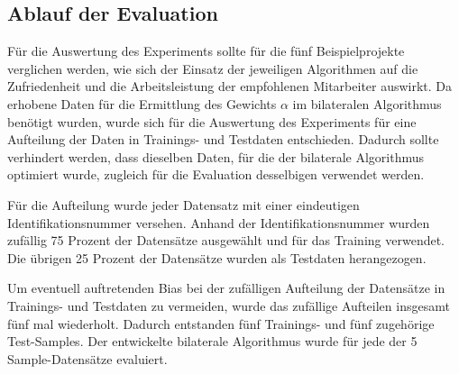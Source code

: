 




\subsection{Ablauf der Evaluation}
\label{ch:methodik:auswertung:ablauf}
Für die Auswertung des Experiments sollte für die fünf Beispielprojekte verglichen werden, wie sich der Einsatz der jeweiligen Algorithmen auf die Zufriedenheit und die Arbeitsleistung der empfohlenen Mitarbeiter auswirkt.
Da erhobene Daten für die Ermittlung des Gewichts $\alpha$ im bilateralen Algorithmus benötigt wurden, wurde sich für die Auswertung des Experiments für eine Aufteilung der Daten in Trainings- und Testdaten entschieden.
Dadurch sollte verhindert werden, dass dieselben Daten, für die der bilaterale Algorithmus optimiert wurde, zugleich für die Evaluation desselbigen verwendet werden.

Für die Aufteilung wurde jeder Datensatz mit einer eindeutigen Identifikationsnummer versehen.
Anhand der Identifikationsnummer wurden zufällig 75 Prozent der Datensätze ausgewählt und für das Training verwendet.
Die übrigen 25 Prozent der Datensätze wurden als Testdaten herangezogen.

Um eventuell auftretenden Bias bei der zufälligen Aufteilung der Datensätze in Trainings- und Testdaten zu vermeiden, wurde das zufällige Aufteilen insgesamt fünf mal wiederholt.
Dadurch entstanden fünf Trainings- und fünf zugehörige Test-Samples.
Der entwickelte bilaterale Algorithmus wurde für jede der 5 Sample-Datensätze evaluiert.

